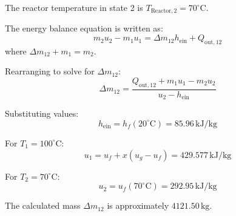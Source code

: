 The reactor temperature in state 2 is \( T_{\text{Reactor},2} = 70^\circ\text{C} \).  

The energy balance equation is written as:  
\[
m_2 u_2 - m_1 u_1 = \Delta m_{12} h_{\text{ein}} + Q_{\text{out},12}
\]  
where \( \Delta m_{12} + m_1 = m_2 \).  

Rearranging to solve for \( \Delta m_{12} \):  
\[
\Delta m_{12} = \frac{Q_{\text{out},12} + m_1 u_1 - m_2 u_2}{u_2 - h_{\text{ein}}}
\]  

Substituting values:  
\[
h_{\text{ein}} = h_f(20^\circ\text{C}) = 85.96 \, \text{kJ/kg}
\]  

For \( T_1 = 100^\circ\text{C} \):  
\[
u_1 = u_f + x (u_g - u_f) = 429.577 \, \text{kJ/kg}
\]  

For \( T_2 = 70^\circ\text{C} \):  
\[
u_2 = u_f(70^\circ\text{C}) = 292.95 \, \text{kJ/kg}
\]  

The calculated mass \( \Delta m_{12} \) is approximately \( 4121.50 \, \text{kg} \).